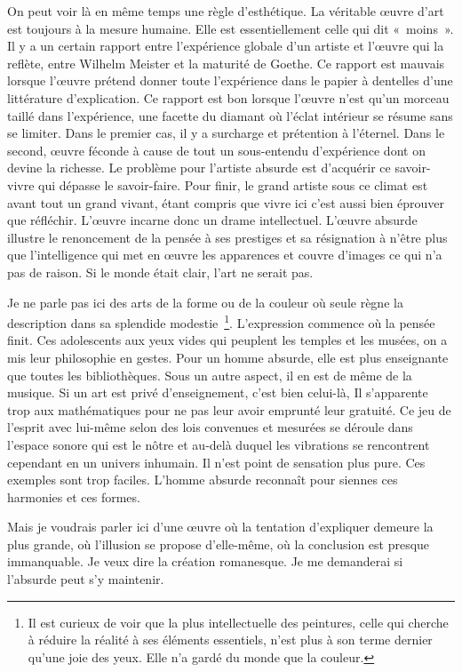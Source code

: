 \documentclass{book}
\begin{document}
On peut voir là en même temps une règle d'esthétique. La véritable œuvre d'art est toujours à la mesure humaine. Elle est essentiellement celle qui dit « moins ». Il y a un certain rapport entre l'expérience globale d'un artiste et l'œuvre qui la reflète, entre Wilhelm Meister et la maturité de Goethe. Ce rapport est mauvais lorsque l'œuvre prétend donner toute l'expérience dans le papier à dentelles d'une littérature d'explication. Ce rapport est bon lorsque l’œuvre n'est qu'un morceau taillé dans l'expérience, une facette du diamant où l'éclat intérieur se résume sans se limiter. Dans le premier cas, il y a surcharge et prétention à l'éternel. Dans le second, œuvre féconde à cause de tout un sous-entendu d'expérience dont on devine la richesse. Le problème pour l'artiste absurde est d'acquérir ce savoir-vivre qui dépasse le savoir-faire. Pour finir, le grand artiste sous ce climat est avant tout un grand vivant, étant compris que vivre ici c'est aussi bien éprouver que réfléchir. L'œuvre incarne donc un drame intellectuel. L'œuvre absurde illustre le renoncement de la pensée à ses prestiges et sa résignation à n'être plus que l'intelligence qui met en œuvre les apparences et couvre d'images ce qui n'a pas de raison. Si le monde était clair, l'art ne serait pas.

Je ne parle pas ici des arts de la forme ou de la couleur où seule règne la description dans sa splendide modestie \footnote{Il est curieux de voir que la plus intellectuelle des peintures, celle qui cherche à réduire la réalité à ses éléments essentiels, n'est plus à son terme dernier qu'une joie des yeux. Elle n'a gardé du monde que la couleur.}. L'expression commence où la pensée finit. Ces adolescents aux yeux vides qui peuplent les temples et les musées, on a mis leur philosophie en gestes. Pour un homme absurde, elle est plus enseignante que toutes les bibliothèques. Sous un autre aspect, il en est de même de la musique. Si un art est privé d'enseignement, c'est bien celui-là, Il s'apparente trop aux mathématiques pour ne pas leur avoir emprunté leur gratuité. Ce jeu de l'esprit avec lui-même selon des lois convenues et mesurées se déroule dans l’espace sonore qui est le nôtre et au‑delà duquel les vibrations se rencontrent cependant en un univers inhumain. Il n'est point de sensation plus pure. Ces exemples sont trop faciles. L'homme absurde reconnaît pour siennes ces harmonies et ces formes.

Mais je voudrais parler ici d'une œuvre où la tentation d'expliquer demeure la plus grande, où l'illusion se propose d'elle-même, où la conclusion est presque immanquable. Je veux dire la création romanesque. Je me demanderai si l'absurde peut s'y maintenir.
\end{document}
